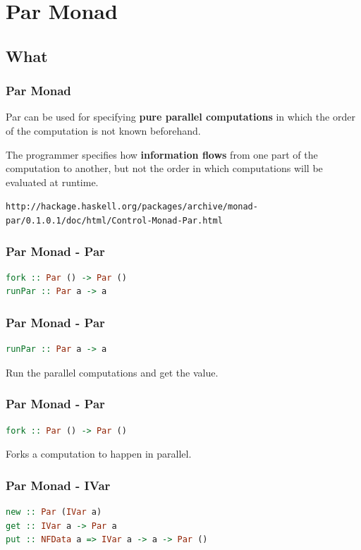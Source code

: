 \documentclass[12pt, danish]{beamer}
\begin{document}
\section{Par Monad}

\subsection{What}

\begin{frame}
  \frametitle{Par Monad}
  Par can be used for specifying \textbf{pure parallel computations} in which the order of the computation is not known beforehand. \newline
  
  The programmer specifies how \textbf{information flows} from one part of the computation to another, but not the order in which computations will be evaluated at runtime.\newline
  
  \tiny{\texttt{http://hackage.haskell.org/packages/archive/monad-par/0.1.0.1/doc/html/Control-Monad-Par.html}}
\end{frame}

\begin{frame}[fragile]
  \frametitle{Par Monad - Par}
  \begin{lstlisting}[language=Haskell]
fork :: Par () -> Par ()
runPar :: Par a -> a
  \end{lstlisting}
\end{frame}

\begin{frame}[fragile]
  \frametitle{Par Monad - Par}
  \begin{lstlisting}[language=Haskell]
runPar :: Par a -> a
  \end{lstlisting}

  Run the parallel computations and get the value.
\end{frame}

\begin{frame}[fragile]
  \frametitle{Par Monad - Par}
  \begin{lstlisting}[language=Haskell]
fork :: Par () -> Par ()
  \end{lstlisting}

  Forks a computation to happen in parallel.
\end{frame}

\begin{frame}[fragile]
  \frametitle{Par Monad - IVar}
  \begin{lstlisting}[language=Haskell]
new :: Par (IVar a)
get :: IVar a -> Par a
put :: NFData a => IVar a -> a -> Par ()
  \end{lstlisting}
\end{frame}
\end{document}
